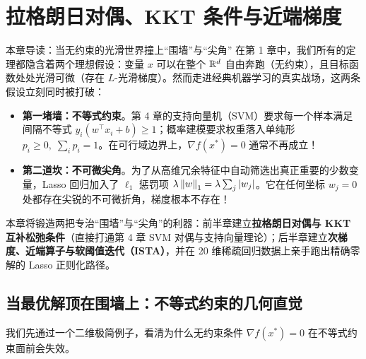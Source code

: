 \chapter[拉格朗日对偶、KKT 与近端梯度]{拉格朗日对偶、KKT 条件与近端梯度}\label{ch:v4-duality}


\begin{chapIntro}{本章导读：当无约束的光滑世界撞上“围墙”与“尖角”}
在第 1 章中，我们所有的定理都隐含着两个理想假设：变量 $x$ 可以在整个 $\mathbb{R}^d$ 自由奔跑（无约束），且目标函数处处光滑可微（存在 $L$-光滑梯度）。然而走进经典机器学习的真实战场，这两条假设立刻同时被打破：
\begin{itemize}
  \item \textbf{第一堵墙：不等式约束}。第 4 章的支持向量机（SVM）要求每一个样本满足间隔不等式 $y_i(w^\top x_i + b) \ge 1$；概率建模要求权重落入单纯形 $p_i \ge 0,\; \sum_i p_i = 1$。在可行域边界上，$\nabla f(x^*) = 0$ 通常不再成立！
  \item \textbf{第二道坎：不可微尖角}。为了从高维冗余特征中自动筛选出真正重要的少数变量，Lasso 回归加入了 $\ell_1$ 惩罚项 $\lambda\left\|w\right\|_1 = \lambda\sum_j |w_j|$。它在任何坐标 $w_j = 0$ 处都存在尖锐的不可微折角，梯度根本不存在！
\end{itemize}
本章将锻造两把专治“围墙”与“尖角”的利器：前半章建立\textbf{拉格朗日对偶与 KKT 互补松弛条件}（直接打通第 4 章 SVM 对偶与支持向量理论）；后半章建立\textbf{次梯度、近端算子与软阈值迭代（ISTA）}，并在 20 维稀疏回归数据上亲手跑出精确零解的 Lasso 正则化路径。
\end{chapIntro}

\section{当最优解顶在围墙上：不等式约束的几何直觉}

我们先通过一个二维极简例子，看清为什么无约束条件 $\nabla f(x^*) = 0$ 在不等式约束面前会失效。

